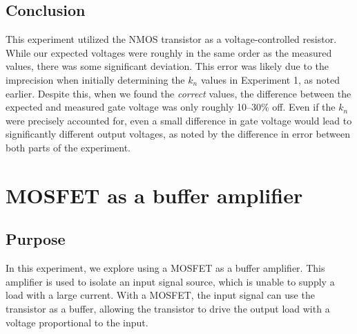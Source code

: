 \documentclass{report}
\begin{document}
\subsection{Conclusion}
This experiment utilized the NMOS transistor as a voltage-controlled resistor. While our expected voltages were roughly in the same order as the measured values, there was some significant deviation. This error was likely due to the imprecision when initially determining the $k_n$ values in Experiment 1, as noted earlier. Despite this, when we found the \textit{correct} values, the difference between the expected and measured gate voltage was only roughly 10--30\% off. Even if the $k_n$ were precisely accounted for, even a small difference in gate voltage would lead to significantly different output voltages, as noted by the difference in error between both parts of the experiment.

\pagebreak
\section{MOSFET as a buffer amplifier}

\subsection{Purpose}
In this experiment, we explore using a MOSFET as a buffer amplifier. This amplifier is used to isolate an input signal source, which is unable to supply a load with a large current. With a MOSFET, the input signal can use the transistor as a buffer, allowing the transistor to drive the output load with a voltage proportional to the input.
\end{document}
